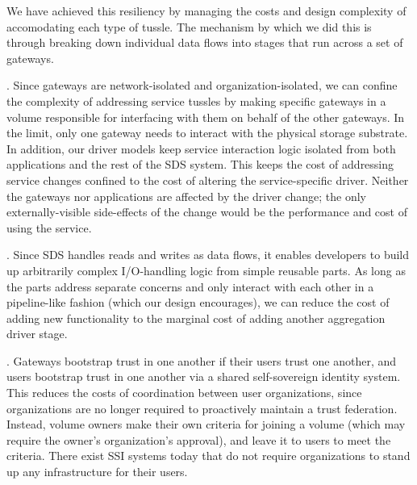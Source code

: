 We have achieved this resiliency by managing the costs and design complexity of
accomodating each type of tussle.  The mechanism by which we did this is through
breaking down individual data flows into stages that run across a set of
gateways.

.  Since gateways are
network-isolated and organization-isolated, we can confine the complexity of
addressing service tussles by making specific gateways in a volume responsible
for interfacing with them on behalf of the other gateways.  In the limit, only
one gateway needs to interact with the physical storage substrate.  In addition,
our driver models keep service interaction logic isolated from both applications
and the rest of the SDS system.  This keeps the cost of addressing service
changes confined to the cost of altering the service-specific driver.  Neither
the gateways nor applications are affected by the driver change; the only
externally-visible side-effects of the change would be the performance and cost
of using the service.

.  Since SDS handles reads
and writes as data flows, it enables developers to build up arbitrarily complex
I/O-handling logic from simple reusable parts.  As long as the parts address
separate concerns and only interact with each other in a pipeline-like fashion
(which our design encourages), we can reduce the cost of adding new
functionality to the marginal cost of adding another aggregation driver stage.

.  Gateways bootstrap
trust in one another if their users trust one another, and users bootstrap trust
in one another via a shared self-sovereign identity system.  This reduces the costs of
coordination between user organizations, since organizations are no longer
required to proactively maintain a trust federation.  Instead, volume owners
make their own criteria for joining a volume (which may require the owner's
organization's approval), and leave it to users to meet the criteria.
There exist SSI systems today that do not require organizations to stand up any
infrastructure for their users.
